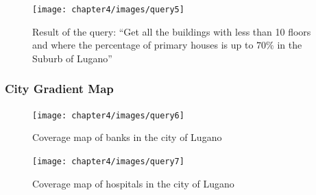\begin{figure} [H]
\centering
\texttt{[image: chapter4/images/query5]}
\caption{Result of the query: ``Get all the buildings with less than 10 floors and where the percentage of primary houses is up to $70\%$ in the Suburb of Lugano''}
\label{fig:query5}
\end{figure} 

\subsubsection{City Gradient Map}

\begin{figure} [H]
\centering
\texttt{[image: chapter4/images/query6]}
\caption{Coverage map of banks in the city of Lugano}
\label{fig:query6}
\end{figure} 
\begin{figure} [H]
\centering
\texttt{[image: chapter4/images/query7]}
\caption{Coverage map of hospitals in the city of Lugano}
\label{fig:query7}
\end{figure} 